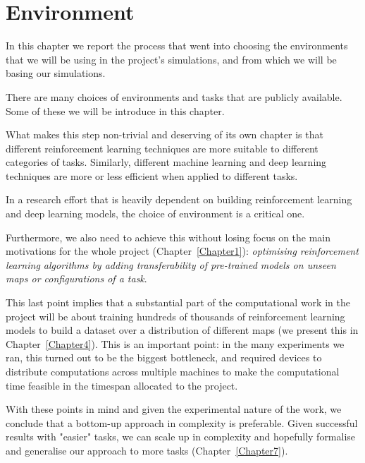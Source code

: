 
\chapter{Environment} %

\label{Chapter3} %


In this chapter we report the process that went into choosing the environments that we will be using in the project's simulations, and from which we will be basing our simulations.

There are many choices of environments and tasks that are publicly available. Some of these we will be introduce in this chapter.

What makes this step non-trivial and deserving of its own chapter is that different reinforcement learning techniques are more suitable to different categories of tasks. Similarly, different machine learning and deep learning techniques are more or less efficient when applied to different tasks.

In a research effort that is heavily dependent on building reinforcement learning and deep learning models, the choice of environment is a critical one.

Furthermore, we also need to achieve this without losing focus on the main motivations for the whole project (Chapter~\ref{Chapter1}): \textit{optimising reinforcement learning algorithms by adding transferability of pre-trained models on unseen maps or configurations of a task}.

This last point implies that a substantial part of the computational work in the project will be about training hundreds of thousands of reinforcement learning models to build a dataset over a distribution of different maps (we present this in Chapter~\ref{Chapter4}). This is an important point: in the many experiments we ran, this turned out to be the biggest bottleneck, and required devices to distribute computations across multiple machines to make the computational time feasible in the timespan allocated to the project.

With these points in mind and given the experimental nature of the work, we conclude that a bottom-up approach in complexity is preferable. Given successful results with "easier" tasks, we can scale up in complexity and hopefully formalise and generalise our approach to more tasks (Chapter~\ref{Chapter7}).

